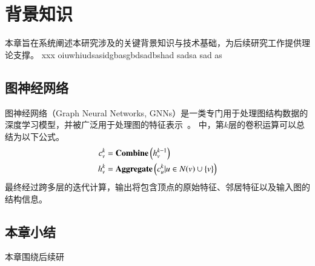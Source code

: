 \chapter{背景知识}
\label{chapter:background}


本章旨在系统阐述本研究涉及的关键背景知识与技术基础，为后续研究工作提供理论支撑。
xxx oiuwhiudsasidgbasgbdsadbshad
sadsa sad as




\section{图神经网络}

图神经网络（Graph Neural Networks, GNNs）是一类专门用于处理图结构数据的深度学习模型，并被广泛用于处理图的特征表示~\cite{kipf2016semi}。
中，第$k$层的卷积运算可以总结为以下公式。
\begin{align} 
c_v^k &=\text{\textbf{Combine}} \left(h_v^{k-1} \right) \\
h_v^k &=\text{\textbf{Aggregate}} \left(c_u^k|u\in N(v) \cup \{v\} \right) 
\end{align}
最终经过跨多层的迭代计算，输出将包含顶点的原始特征、邻居特征以及输入图的结构信息。



\section{本章小结}
本章围绕后续研